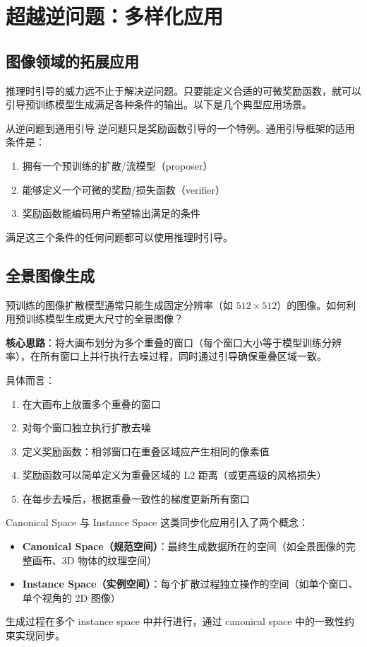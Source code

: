 \section{超越逆问题：多样化应用}

\subsection{图像领域的拓展应用}

推理时引导的威力远不止于解决逆问题。只要能定义合适的可微奖励函数，就可以引导预训练模型生成满足各种条件的输出。以下是几个典型应用场景。

\begin{knowledgebox}{从逆问题到通用引导}
逆问题只是奖励函数引导的一个特例。通用引导框架的适用条件是：
\begin{enumerate}
    \item 拥有一个预训练的扩散/流模型（proposer）
    \item 能够定义一个可微的奖励/损失函数（verifier）
    \item 奖励函数能编码用户希望输出满足的条件
\end{enumerate}
满足这三个条件的任何问题都可以使用推理时引导。
\end{knowledgebox}

\subsection{全景图像生成}

预训练的图像扩散模型通常只能生成固定分辨率（如 $512 \times 512$）的图像。如何利用预训练模型生成更大尺寸的全景图像？

\textbf{核心思路}：将大画布划分为多个重叠的窗口（每个窗口大小等于模型训练分辨率），在所有窗口上并行执行去噪过程，同时通过引导确保重叠区域一致。

具体而言：
\begin{enumerate}
    \item 在大画布上放置多个重叠的窗口
    \item 对每个窗口独立执行扩散去噪
    \item 定义奖励函数：相邻窗口在重叠区域应产生相同的像素值
    \item 奖励函数可以简单定义为重叠区域的 L2 距离（或更高级的风格损失）
    \item 在每步去噪后，根据重叠一致性的梯度更新所有窗口
\end{enumerate}

\begin{importantbox}{Canonical Space 与 Instance Space}
这类同步化应用引入了两个概念：
\begin{itemize}
    \item \textbf{Canonical Space（规范空间）}：最终生成数据所在的空间（如全景图像的完整画布、3D 物体的纹理空间）
    \item \textbf{Instance Space（实例空间）}：每个扩散过程独立操作的空间（如单个窗口、单个视角的 2D 图像）
\end{itemize}
生成过程在多个 instance space 中并行进行，通过 canonical space 中的一致性约束实现同步。
\end{importantbox}

